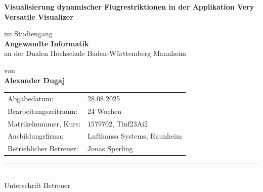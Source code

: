 \documentclass[a4paper,12pt]{article}
\begin{document}
 \justifying  
 \sloppy


\setlength{\topskip}{60pt}  

\begin{center}
    \setlength{\baselineskip}{18pt}
    {\large \textbf{Visualisierung dynamischer Flugrestriktionen in der Applikation Very Versatile Visualizer}} \\[0.4cm]
\end{center}

\vspace{1cm}  

\begin{center}
    \setlength{\baselineskip}{18pt}
    im Studiengang \\
    {\color{red} \textbf{Angewandte Informatik}}\\
    an der Dualen Hochschule Baden-Württemberg Mannheim
\end{center}

\vspace{1.5cm}

\begin{center}
    \setlength{\baselineskip}{18pt}
    von \\
    {\color{red} \textbf{Alexander Dugaj}}
\end{center}

\vspace{5cm}

\begin{flushleft}
    \begin{tabular}{l l}
        Abgabedatum:          & {\color{red} 28.08.2025} \\[0.3cm]
        Bearbeitungszeitraum: & {\color{red} 24 Wochen}  \\[0.3cm]
        Matrikelnummer, Kurs: & {\color{red} 1579702, Tinf23Ai2} \\[0.3cm]
        Ausbildungsfirma:     & {\color{red} Lufthansa Systems, Raunheim} \\[0.3cm]
        Betrieblicher Betreuer: & {\color{red} Jonas Sperling} \\[1cm]
    \end{tabular}
\end{flushleft}

\vfill

\begin{flushleft}
    \rule{6cm}{0.4pt} \\ 
    Unterschrift Betreuer
\end{flushleft}
\end{document}
